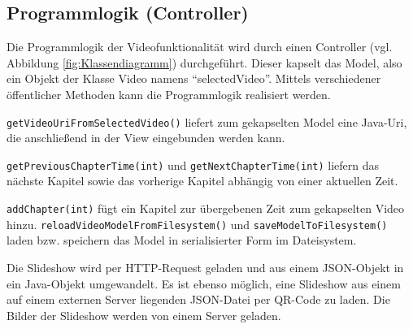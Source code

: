 \subsection{Programmlogik (Controller)}
Die Programmlogik der Videofunktionalität wird durch einen Controller (vgl. Abbildung \ref{fig:Klassendiagramm}) durchgeführt. Dieser kapselt das Model, also ein Objekt der Klasse Video namens \enquote{selectedVideo}. Mittels verschiedener öffentlicher Methoden kann die Programmlogik realisiert werden. 

\texttt{getVideoUriFromSelectedVideo()} liefert zum gekapselten Model eine Java-Uri, die anschließend in der View eingebunden werden kann.

\texttt{getPreviousChapterTime(int)} und \texttt{getNextChapterTime(int)} liefern das nächste Kapitel sowie das vorherige Kapitel abhängig von einer aktuellen Zeit. 

\texttt{addChapter(int)} fügt ein Kapitel zur übergebenen Zeit zum gekapselten Video hinzu. 
\texttt{reloadVideoModelFromFilesystem()} und \texttt{saveModelToFilesystem()} laden bzw. speichern das Model in serialisierter Form im Dateisystem.

Die Slideshow wird per HTTP-Request geladen und aus einem JSON-Objekt in ein Java-Objekt umgewandelt. Es ist ebenso möglich, eine Slideshow aus einem auf einem externen Server liegenden JSON-Datei per QR-Code zu laden. Die Bilder der Slideshow werden von einem Server geladen.